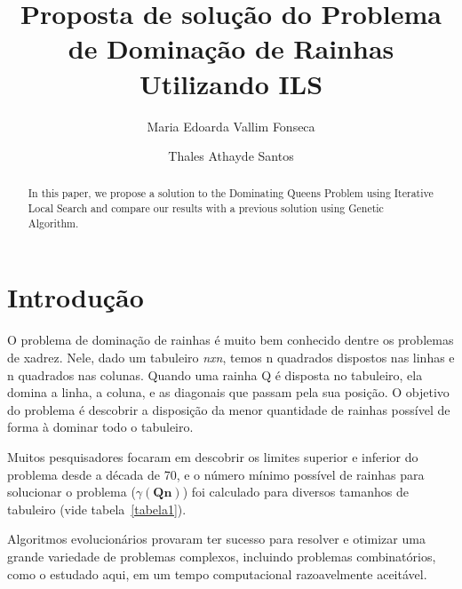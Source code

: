\documentclass[sigconf]{acmart}
\begin{document}
\title{Proposta de solução do Problema de Dominação de Rainhas Utilizando ILS}

\author{Maria Edoarda Vallim Fonseca}

\author{Thales Athayde Santos}

\begin{abstract}
In this paper, we propose a solution to the Dominating Queens Problem
using Iterative Local Search and compare our results with a previous 
solution using Genetic Algorithm.
\end{abstract}

%
%


\maketitle

\section{Introdução}

O problema de dominação de rainhas é muito bem conhecido
dentre os problemas de xadrez. Nele, dado um tabuleiro \textit{nxn}, temos n quadrados dispostos nas linhas e n quadrados nas colunas. Quando uma rainha Q é disposta no tabuleiro, ela domina a linha, a coluna, e as diagonais que passam pela sua posição. O objetivo do problema é descobrir a disposição da menor quantidade de rainhas possível de forma à dominar todo o tabuleiro.

 Muitos pesquisadores focaram em descobrir os limites superior e inferior do problema desde a década de 70,  e o número mínimo possível de rainhas para solucionar o problema ($\gamma(\textbf{Qn})$) foi calculado para diversos tamanhos de tabuleiro (vide tabela~\ref{tabela1}).

 Algoritmos evolucionários provaram ter sucesso para resolver e otimizar uma grande variedade de problemas complexos, incluindo problemas combinatórios, como o estudado aqui, em um tempo computacional razoavelmente aceitável.~\cite{doerr2011evolutionary}
\end{document}
